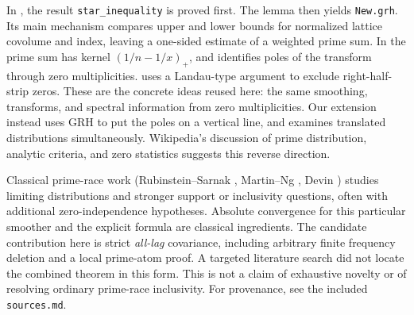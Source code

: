 \documentclass[11pt]{article}
\theoremstyle{remark}\newtheorem{remark}[theorem]{Remark}
\begin{document}
In , the result \texttt{star\_inequality} is proved first. The lemma  then yields \texttt{New.grh}. Its main mechanism compares upper and lower bounds for normalized lattice covolume and index, leaving a one-sided estimate of a weighted prime sum. In  the prime sum has kernel $(1/n-1/x)_+$, and  identifies poles of the transform through zero multiplicities.  uses a Landau-type argument to exclude right-half-strip zeros. These are the concrete ideas reused here: the same smoothing, transforms, and spectral information from zero multiplicities. Our extension instead uses GRH to put the poles on a vertical line, and examines translated distributions simultaneously. Wikipedia's discussion of prime distribution, analytic criteria, and zero statistics \cite{wiki} suggests this reverse direction.

Classical prime-race work (Rubinstein--Sarnak \cite{RS}, Martin--Ng \cite{MN}, Devin \cite{Devin}) studies limiting distributions and stronger support or inclusivity questions, often with additional zero-independence hypotheses. Absolute convergence for this particular smoother and the explicit formula are classical ingredients. The candidate contribution here is strict \emph{all-lag} covariance, including arbitrary finite frequency deletion and a local prime-atom proof. A targeted literature search did not locate the combined theorem in this form. This is not a claim of exhaustive novelty or of resolving ordinary prime-race inclusivity. For provenance, see the included \texttt{sources.md}.
\end{document}
